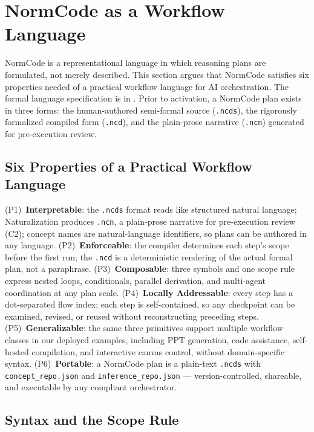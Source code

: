 \section{NormCode as a Workflow Language}
\label{sec:normcode}

NormCode is a representational language in which reasoning plans are formulated, not
merely described. This section argues that NormCode satisfies six properties needed of a
practical workflow language for AI orchestration. The formal language specification is
in \cite{guan2026normcodesemiformallanguageauditable}. Prior to activation, a NormCode plan exists in three forms: the human-authored
semi-formal source (\texttt{.ncds}), the rigorously formalized compiled form
(\texttt{.ncd}), and the plain-prose narrative (\texttt{.ncn}) generated for
pre-execution review.

\subsection{Six Properties of a Practical Workflow Language}

(P1)~\textbf{Interpretable}: the \texttt{.ncds} format reads like structured natural
language; Naturalization produces \texttt{.ncn}, a plain-prose narrative for
pre-execution review (C2); concept names are natural-language identifiers, so plans can
be authored in any language. (P2)~\textbf{Enforceable}: the compiler determines each
step's scope before the first run; the \texttt{.ncd} is a deterministic rendering of
the actual formal plan, not a paraphrase. (P3)~\textbf{Composable}: three symbols and
one scope rule express nested loops, conditionals, parallel derivation, and multi-agent
coordination at any plan scale. (P4)~\textbf{Locally Addressable}: every step has a
dot-separated flow index; each step is self-contained, so any checkpoint can be
examined, revised, or reused without reconstructing preceding steps.
(P5)~\textbf{Generalizable}: the same three primitives support multiple workflow classes
in our deployed examples, including PPT generation, code assistance, self-hosted
compilation, and interactive canvas control, without domain-specific syntax.
(P6)~\textbf{Portable}: a NormCode plan is a plain-text
\texttt{.ncds} with \texttt{concept\_repo.json} and \texttt{inference\_repo.json} ---
version-controlled, shareable, and executable by any compliant orchestrator.

\subsection{Syntax and the Scope Rule}

